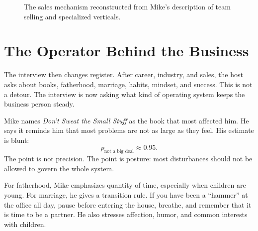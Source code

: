\begin{figure}
\centering
{}
\caption{The sales mechanism reconstructed from Mike's description of team selling and specialized verticals.}
\end{figure}

\section{The Operator Behind the Business}

The interview then changes register. After career, industry, and sales, the host asks about books, fatherhood, marriage, habits, mindset, and success. This is not a detour. The interview is now asking what kind of operating system keeps the business person steady.

Mike names \emph{Don't Sweat the Small Stuff} as the book that most affected him. He says it reminds him that most problems are not as large as they feel. His estimate is blunt:
\begin{equation}
p_{\text{not a big deal}} \approx 0.95.
\end{equation}
The point is not precision. The point is posture: most disturbances should not be allowed to govern the whole system.

For fatherhood, Mike emphasizes quantity of time, especially when children are young. For marriage, he gives a transition rule. If you have been a ``hammer'' at the office all day, pause before entering the house, breathe, and remember that it is time to be a partner. He also stresses affection, humor, and common interests with children.

